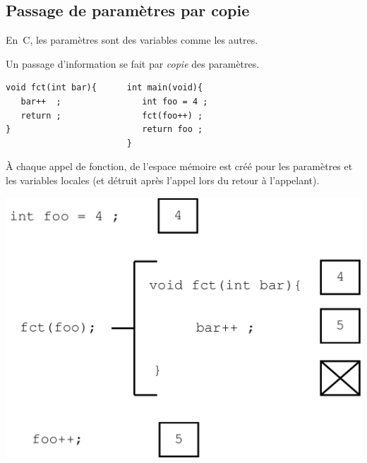 \begin{frame}[fragile]
  \section{Passage de param\`etres par copie}%
  En~C, les param\`etres sont des variables comme les autres.
  \par
  Un passage d'information se fait par {\em copie} des param\`etres.
\begin{verbatim}
void fct(int bar){      int main(void){  
   bar++  ;                int foo = 4 ;     
   return ;                fct(foo++) ;    
}                          return foo ;  
                        }                
\end{verbatim}
  \`A chaque appel de fonction, de l'espace m\'emoire est cr\'e\'e pour
  les param\`etres et les variables locales (et d\'etruit apr\`es
  l'appel lors du retour \`a l'appelant).
 \begin{center}
   \includegraphics[scale=.2]{passPar}
 \end{center}
\end{frame}
